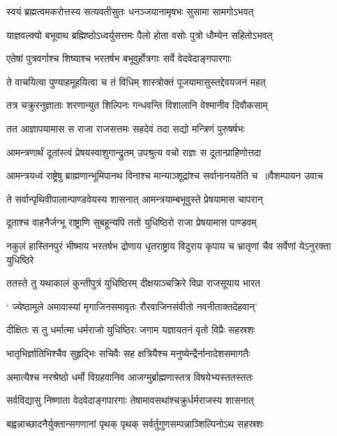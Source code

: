 \twolineshloka
{स्वयं ब्रह्मत्वमकरोत्तस्य सत्यवतीसुतः}
{धनञ्जयानामृषभः सुसामा सामगोऽभवत्}


\twolineshloka
{याज्ञवल्क्यो बभूवाथ ब्रह्मिष्ठोऽध्वर्युसत्तमः}
{पैलो होता वसोः पुत्रो धौम्येन सहितोऽभवत्}


\twolineshloka
{एतेषां पुत्रवर्गाश्च शिष्याश्च भरतर्षभ}
{बभूवुर्होत्रगाः सर्वे वेदवेदाङ्गपारगाः}


\twolineshloka
{ते वाचयित्वा पुण्याहमूहयित्वा च तं विधिम्}
{शास्त्रोक्तं पूजयामासुस्तद्देवयजनं महत्}


\twolineshloka
{तत्र चक्रुरनुज्ञाताः शरणान्युत शिल्पिनः}
{गन्धवन्ति विशालानि वेश्मानीव दिवौकसाम्}


\twolineshloka
{तत आज्ञापयामास स राजा राजसत्तमः}
{सहदेवं तदा सद्यो मन्त्रिणं पुरुषर्षभः}


\twolineshloka
{आमन्त्रणार्थं दूतांस्त्वं प्रेषयस्वाशुगान्द्रुतम्}
{उपश्रुत्य वचो राज्ञः स दूतान्प्राहिणोत्तदा}


\twolineshloka
{आमन्त्रयध्वं राष्ट्रेषु ब्राह्मणान्भूमिपानथ}
{विनाश्च मान्याञ्शूद्रांश्च सर्वानानयतेति च ॥वैशम्पायन उवाच}


\twolineshloka
{ते सर्वान्पृथिवीपालान्पाण्डवेयस्य शासनात्}
{आमन्त्रयाम्बभूवुस्ते प्रेषयामास चापरान्}


\twolineshloka
{दूताश्च वाहनैर्जग्भू राष्ट्राणि सुबहून्यपि}
{ततो युधिष्ठिरो राजा प्रेषयामास पाण्डवम्}


\threelineshloka
{नकुलं हास्तिनपुरं भीष्माय भरतर्षभ}
{द्रोणाय धृतराष्ट्राय विदुराय कृपाय च}
{भ्रातृणां चैव सर्वेणां येऽनुरक्ता युधिष्ठिरे}


\twolineshloka
{ततस्ते तु यथाकालं कुन्तीपुत्रं युधिष्ठिरम्}
{दीक्षयाञ्चक्रिरे विप्रा राजसूयाय भारत}


\twolineshloka
{` ज्येष्ठामूले अमावास्यां मृगाजिनसमावृतः}
{रौरवाजिनसंवीतो नवनीताक्तदेहवान्'}


\twolineshloka
{दीक्षितः स तु धर्मात्मा धर्मराजो युधिष्ठिरः}
{जगाम यज्ञायतनं वृतो विप्रैः सहस्रशः}


\twolineshloka
{भातृभिर्ज्ञातिभिश्चैव सुहृद्भिः सचिवैः सह}
{क्षत्रियैश्च मनुष्येन्द्रैर्नानादेशसमागतैः}


\twolineshloka
{अमात्यैश्च नरश्रेष्ठो धर्मो विग्रहवानिव}
{आजग्मुर्ब्राह्मणास्तत्र विषयेभ्यस्ततस्ततः}


\twolineshloka
{सर्वविद्यासु निष्णाता वेदवेदाङ्गपारगाः}
{तेषामावसथांश्चक्रुर्धर्मराजस्य शासनात्}


\twolineshloka
{बह्वन्नाच्छादनैर्युक्तान्सगणानां पृथक् पृथक्}
{सर्वर्तुगुणसम्पन्नाञ्शिल्पिनोऽथ सहस्रशः}


